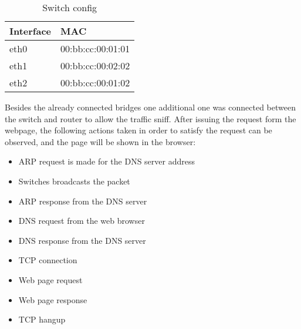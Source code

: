 \begin{center}
  \begin{table}[htb]
  \begin{center}
  \begin{tabular}{| l | l |}
    \hline
	Interface & MAC\\ \hline
	eth0 & 00:bb:cc:00:01:01\\ \hline
	eth1 & 00:bb:cc:00:02:02\\ \hline
	eth2 & 00:bb:cc:00:01:02\\
    \hline
  \end{tabular}
  \end{center}
  \caption{Switch config}
  \label{table:complex-switch}
  \end{table}
\end{center}
Besides the already connected bridges one additional one was connected between the switch and router to allow the traffic sniff.
After issuing the request form the webpage, the following actions taken in order to satisfy the request can be observed, and the page will be shown in the browser:
\begin{itemize}
	\item ARP request is made for the DNS server address
	\item Switches broadcasts the packet
	\item ARP response from the DNS server
	\item DNS request from the web browser
	\item DNS response from the DNS server
	\item TCP connection
	\item Web page request
	\item Web page response
	\item TCP hangup
\end{itemize}

